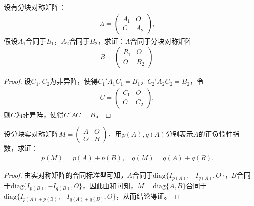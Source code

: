 \documentclass[../../main.tex]{subfiles}%
\begin{document}
\begin{proposition}\label{proposition:分块准对角阵合同于每个块的合同阵}
设有分块对称矩阵：
\begin{align*}
A = \begin{pmatrix}
A_1 & O \\
O & A_2
\end{pmatrix},
\end{align*}
假设\(A_1\)合同于\(B_1\)，\(A_2\)合同于\(B_2\)，求证：\(A\)合同于分块对称矩阵
\begin{align*}
B = \begin{pmatrix}
B_1 & O \\
O & B_2
\end{pmatrix}.
\end{align*}
\end{proposition} 
\begin{proof}

设\(C_1,C_2\)为非异阵，使得\(C_1'A_1C_1 = B_1\)，\(C_2'A_2C_2 = B_2\)，令
\begin{align*}
C = \begin{pmatrix}
C_1 & O \\
O & C_2
\end{pmatrix},
\end{align*}
则\(C\)为非异阵，使得\(C'AC = B\)。

\end{proof}

\begin{proposition}\label{proposition:分块准对角阵的正负惯性指数}
设分块实对称矩阵\(M = \begin{pmatrix}
A & O \\
O & B
\end{pmatrix}\)，用\(p(A),q(A)\)分别表示\(A\)的正负惯性指数，求证：
\begin{align*}
p(M)=p(A)+p(B),\quad q(M)=q(A)+q(B).
\end{align*}
\end{proposition} 
\begin{proof}

由实对称矩阵的合同标准型可知，\(A\)合同于\(\mathrm{diag}\{I_{p(A)}, -I_{q(A)},O\}\)，\(B\)合同于\(\mathrm{diag}\{I_{p(B)}, -I_{q(B)},O\}\)，因此由和可知，\(M = \mathrm{diag}\{A,B\}\)合同于\(\mathrm{diag}\{I_{p(A)+p(B)}, -I_{q(A)+q(B)},O\}\)，从而结论得证。

\end{proof}
\end{document}
